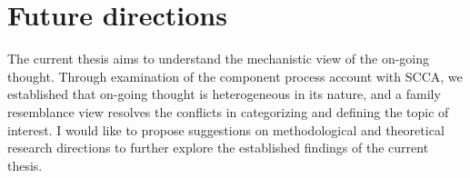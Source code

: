 


\section{Future directions}
\label{ch:discussion:future}
The current thesis aims to understand the mechanistic view of the on-going thought. Through examination of the component process account with SCCA, we established that on-going thought is heterogeneous in its nature, and a family resemblance view resolves the conflicts in categorizing and defining the topic of interest. I would like to propose suggestions on methodological and theoretical research directions to further explore the established findings of the current thesis.

